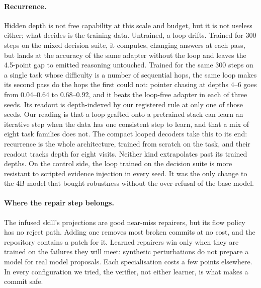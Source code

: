 \documentclass[11pt]{article}
\begin{document}
\paragraph{Recurrence.} Hidden depth is not free capability at this scale and budget, but it is
not useless either; what decides is the training data. Untrained, a loop drifts. Trained for 300
steps on the mixed decision suite, it computes, changing answers at each pass, but lands at the
accuracy of the same adapter without the loop and leaves the 4.5-point gap to emitted reasoning
untouched. Trained for the same 300 steps on a single task whose difficulty is a number of
sequential hops, the same loop makes its second pass do the hops the first could not: pointer
chasing at depths 4--6 goes from 0.04--0.64 to 0.68--0.92, and it beats the loop-free adapter
in each of three seeds. Its readout is depth-indexed by our registered rule at only one of those
seeds. Our reading is that a loop grafted onto a pretrained stack
can learn an iterative step when the data has one consistent step to learn, and that a mix of
eight task families does not. The compact looped decoders take this to its end: recurrence is
the whole architecture, trained from scratch on the task, and their readout tracks depth for
eight visits. Neither kind extrapolates past its trained depths. On the control side, the loop
trained on the decision suite is more resistant to scripted evidence injection in every seed. It
was the only change to the 4B model that bought robustness without the over-refusal of the base
model.

\paragraph{Where the repair step belongs.} The infused skill's projections are good near-miss
repairers, but its flow policy has no reject path. Adding one removes most broken commits at no
cost, and the repository contains a patch for it. Learned repairers win only when they are trained
on the failures they will meet: synthetic perturbations do not prepare a model for real model
proposals. Each specialisation costs a few points elsewhere. In every configuration we tried, the
verifier, not either learner, is what makes a commit safe.
\end{document}
